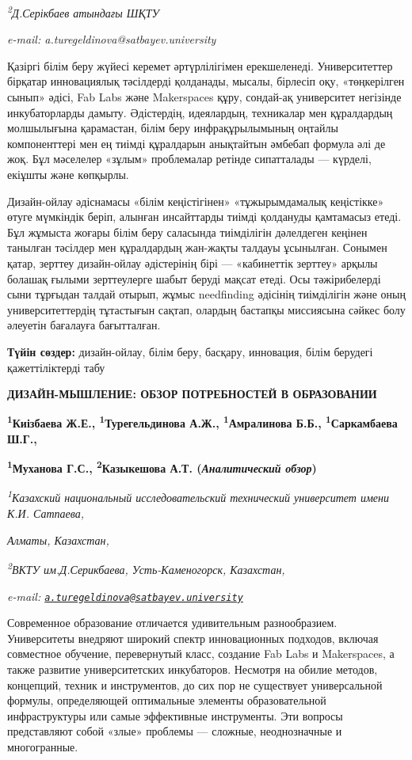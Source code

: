 \emph{\textsuperscript{2}Д.Серікбаев атындағы ШҚТУ}

\emph{e-mail: a.turegeldinova@satbayev.university}

Қазіргі білім беру жүйесі керемет әртүрлілігімен ерекшеленеді.
Университеттер бірқатар инновациялық тәсілдерді қолданады, мысалы,
бірлесіп оқу, «төңкерілген сынып» әдісі, Fab Labs және Makerspaces құру,
сондай-ақ университет негізінде инкубаторларды дамыту. Әдістердің,
идеялардың, техникалар мен құралдардың молшылығына қарамастан, білім
беру инфрақұрылымының оңтайлы компоненттері мен ең тиімді құралдарын
анықтайтын әмбебап формула әлі де жоқ. Бұл мәселелер «зұлым» проблемалар
ретінде сипатталады --- күрделі, екіұшты және көпқырлы.

Дизайн-ойлау әдіснамасы «білім кеңістігінен» «тұжырымдамалық кеңістікке»
өтуге мүмкіндік беріп, алынған инсайттарды тиімді қолдануды қамтамасыз
етеді. Бұл жұмыста жоғары білім беру саласында тиімділігін дәлелдеген
кеңінен танылған тәсілдер мен құралдардың жан-жақты талдауы ұсынылған.
Сонымен қатар, зерттеу дизайн-ойлау әдістерінің бірі --- «кабинеттік
зерттеу» арқылы болашақ ғылыми зерттеулерге шабыт беруді мақсат етеді.
Осы тәжірибелерді сыни тұрғыдан талдай отырып, жұмыс needfinding
әдісінің тиімділігін және оның университеттердің тұтастығын сақтап,
олардың бастапқы миссиясына сәйкес болу әлеуетін бағалауға бағытталған.

{\bfseries Түйін сөздер:} дизайн-ойлау, білім беру, басқару, инновация,
білім берудегі қажеттіліктерді табу

{\bfseries ДИЗАЙН-МЫШЛЕНИЕ: ОБЗОР ПОТРЕБНОСТЕЙ В ОБРАЗОВАНИИ}

{\bfseries \textsuperscript{1}Киізбаева Ж.Е.,
\textsuperscript{1}Турегельдинова А.Ж\textsuperscript{\envelope }.,
\textsuperscript{1}Амралинова Б.Б., \textsuperscript{1}Саркамбаева
Ш.Г.,}

{\bfseries \textsuperscript{1}Муханова Г.С., \textsuperscript{2}Казыкешова
А.Т. (\emph{Аналитический обзор})}

\emph{\textsuperscript{1}Казахский национальный исследовательский
технический университет имени К.И. Сатпаева,}

\emph{Алматы, Казахстан,}

\emph{\textsuperscript{2}ВКТУ им.Д.Серикбаева, Усть-Каменогорск,
Казахстан,}

\emph{e-mail:
\href{mailto:a.turegeldinova@satbayev.university}{\nolinkurl{a.turegeldinova@satbayev.university}}}

Современное образование отличается удивительным разнообразием.
Университеты внедряют широкий спектр инновационных подходов, включая
совместное обучение, перевернутый класс, создание Fab Labs и
Makerspaces, а также развитие университетских инкубаторов. Несмотря на
обилие методов, концепций, техник и инструментов, до сих пор не
существует универсальной формулы, определяющей оптимальные элементы
образовательной инфраструктуры или самые эффективные инструменты. Эти
вопросы представляют собой «злые» проблемы --- сложные, неоднозначные и
многогранные.

